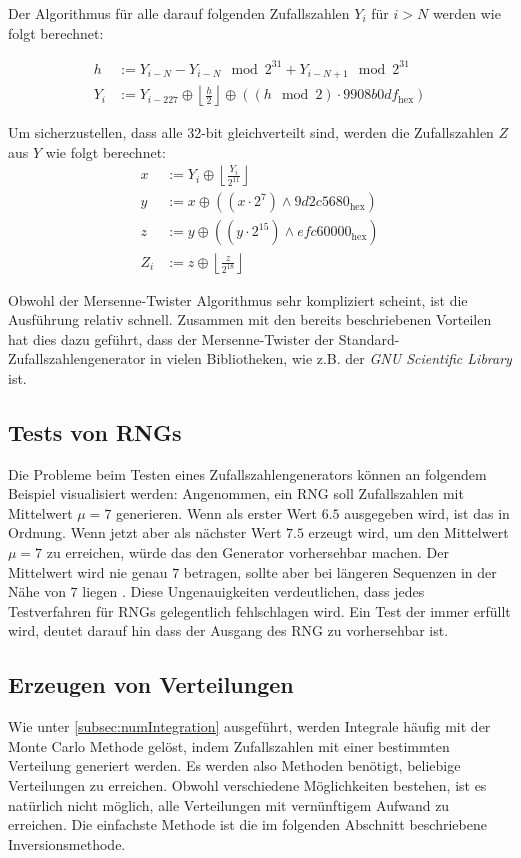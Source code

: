 \documentclass{book}
\begin{document}
\begin{refsection}
Der Algorithmus für alle darauf folgenden Zufallszahlen $Y_i$ für $i>N$ werden wie folgt berechnet:

\begin{align}
	h &:=  Y_{i-N} - Y_{i-N} \mod{2^{31}} + Y_{i-N+1} \mod{2^{31}} \\
	Y_i &:= Y_{i-227} \oplus \left\lfloor \frac{h}{2} \right\rfloor \oplus \left( \left(h \mod{2} \right) \cdot 9908b0df_{\text{hex}}\right)
\end{align}

Um sicherzustellen, dass alle 32-bit gleichverteilt sind, werden die Zufallszahlen $Z$ aus $Y$ wie folgt berechnet: 
\begin{align}
	x &:= Y_{i} \oplus \left\lfloor \frac{Y_i}{2^{11}} \right\rfloor \\
	y &:= x \oplus \left(\left(x \cdot 2^7\right) \wedge 9d2c5680_{\text{hex}} \right) \\
	z &:= y \oplus \left(\left(y \cdot 2^{15}\right) \wedge efc60000_{\text{hex}} \right) \\
	Z_i &:= z \oplus \left\lfloor \frac{z}{2^{18}} \right\rfloor
\end{align}

Obwohl der Mersenne-Twister Algorithmus sehr kompliziert scheint, ist die Ausführung relativ schnell. Zusammen mit den bereits beschriebenen Vorteilen hat dies dazu geführt, dass der Mersenne-Twister der Standard-Zufallszahlengenerator in vielen Bibliotheken, wie z.B. der \textit{GNU Scientific Library} ist.

\newpage
\subsection{Tests von RNGs}
Die Probleme beim Testen eines Zufallszahlengenerators können an folgendem Beispiel visualisiert werden: Angenommen, ein RNG soll Zufallszahlen mit Mittelwert $\mu = 7$ generieren. Wenn als erster Wert $6.5$ ausgegeben wird, ist das in Ordnung. Wenn jetzt aber als nächster Wert $7.5$ erzeugt wird, um den Mittelwert $\mu = 7$ zu erreichen, würde das den Generator vorhersehbar machen. Der Mittelwert wird nie genau $7$ betragen, sollte aber bei längeren Sequenzen in der Nähe von $7$ liegen \cite{rng:BeautifulTesting}. Diese Ungenauigkeiten verdeutlichen, dass jedes Testverfahren für RNGs gelegentlich fehlschlagen wird. Ein Test der immer erfüllt wird, deutet darauf hin dass der Ausgang des RNG zu vorhersehbar ist. \\


\subsection{Erzeugen von Verteilungen}
Wie unter \ref{subsec:numIntegration} ausgeführt, werden Integrale häufig mit der Monte Carlo Methode gelöst, indem Zufallszahlen mit einer bestimmten Verteilung generiert werden. Es werden also Methoden benötigt, beliebige Verteilungen zu erreichen. Obwohl verschiedene Möglichkeiten bestehen, ist es natürlich nicht möglich, alle Verteilungen mit vernünftigem Aufwand zu erreichen. Die einfachste Methode ist die im folgenden Abschnitt beschriebene Inversionsmethode. 


\end{refsection}
\end{document}
